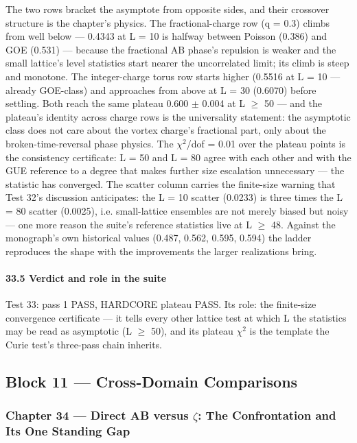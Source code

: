 \documentclass[10pt]{article}
\begin{document}
The two rows bracket the asymptote from opposite sides, and their crossover structure is the chapter's physics. The fractional-charge row (q = 0.3) climbs from well below --- 0.4343 at L = 10 is halfway between Poisson (0.386) and GOE (0.531) --- because the fractional AB phase's repulsion is weaker and the small lattice's level statistics start nearer the uncorrelated limit; its climb is steep and monotone. The integer-charge torus row starts higher (0.5516 at L = 10 --- already GOE-class) and approaches from above at L = 30 (0.6070) before settling. Both reach the same plateau 0.600 $\pm$ 0.004 at L $\ge$ 50 --- and the plateau's identity across charge rows is the universality statement: the asymptotic class does not care about the vortex charge's fractional part, only about the broken-time-reversal phase physics. The $\chi$$^2$/dof = 0.01 over the plateau points is the consistency certificate: L = 50 and L = 80 agree with each other and with the GUE reference to a degree that makes further size escalation unnecessary --- the statistic has converged. The scatter column carries the finite-size warning that Test 32's discussion anticipates: the L = 10 scatter (0.0233) is three times the L = 80 scatter (0.0025), i.e. small-lattice ensembles are not merely biased but noisy --- one more reason the suite's reference statistics live at L $\ge$ 48. Against the monograph's own historical values (0.487, 0.562, 0.595, 0.594) the ladder reproduces the shape with the improvements the larger realizations bring.

\paragraph{33.5 Verdict and role in the suite}

Test 33: pass 1 PASS, HARDCORE plateau PASS. Its role: the finite-size convergence certificate --- it tells every other lattice test at which L the statistics may be read as asymptotic (L $\ge$ 50), and its plateau $\chi$$^2$ is the template the Curie test's three-pass chain inherits.

\subsection{Block 11 --- Cross-Domain Comparisons}

\subsubsection{Chapter 34 --- Direct AB versus $\zeta$: The Confrontation and Its One Standing Gap}
\end{document}
